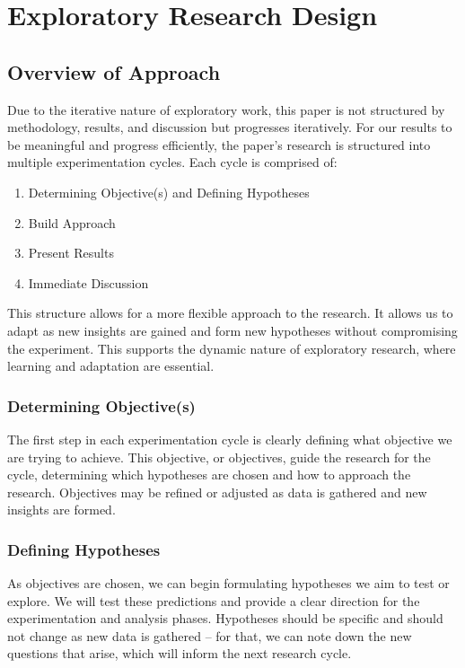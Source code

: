 \chapter{Exploratory Research Design}
\label{chap:exploratoryResearchDesign}

\section{Overview of Approach}
Due to the iterative nature of exploratory work, this paper is not structured by methodology, results, and discussion but progresses iteratively. For our results to be meaningful and progress efficiently, the paper's research is structured into multiple experimentation cycles. Each cycle is comprised of:

\begin{enumerate}
    \item Determining Objective(s) and Defining Hypotheses
    \item Build Approach
    \item Present Results
    \item Immediate Discussion
\end{enumerate}

This structure allows for a more flexible approach to the research. It allows us to adapt as new insights are gained and form new hypotheses without compromising the experiment. This supports the dynamic nature of exploratory research, where learning and adaptation are essential.

\subsection*{Determining Objective(s)}
The first step in each experimentation cycle is clearly defining what objective we are trying to achieve. This objective, or objectives, guide the research for the cycle, determining which hypotheses are chosen and how to approach the research. Objectives may be refined or adjusted as data is gathered and new insights are formed.

\subsection*{Defining Hypotheses}
As objectives are chosen, we can begin formulating hypotheses we aim to test or explore. We will test these predictions and provide a clear direction for the experimentation and analysis phases. Hypotheses should be specific and should not change as new data is gathered -- for that, we can note down the new questions that arise, which will inform the next research cycle.

